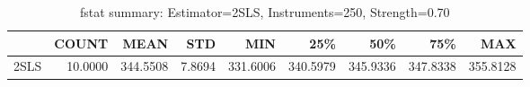 \begin{table}[ht]
\centering
\caption{fstat summary: Estimator=2SLS, Instruments=250, Strength=0.70}
\begin{tabular}{lrrrrrrrr}
\toprule
 & COUNT & MEAN & STD & MIN & 25\% & 50\% & 75\% & MAX \\
\midrule
2SLS & 10.0000 & 344.5508 & 7.8694 & 331.6006 & 340.5979 & 345.9336 & 347.8338 & 355.8128 \\
\bottomrule
\end{tabular}
\end{table}
